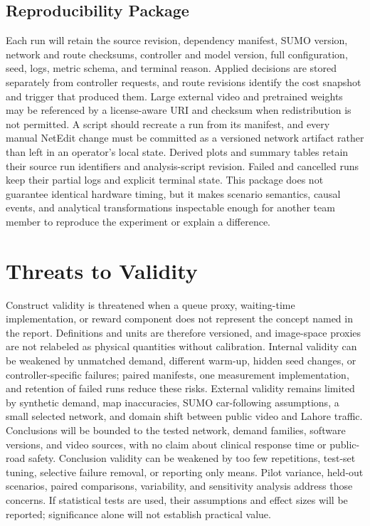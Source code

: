 \subsection{Reproducibility Package}

Each run will retain the source revision, dependency manifest, SUMO version, network and route checksums, controller and model version, full configuration, seed, logs, metric schema, and terminal reason. Applied decisions are stored separately from controller requests, and route revisions identify the cost snapshot and trigger that produced them. Large external video and pretrained weights may be referenced by a license-aware URI and checksum when redistribution is not permitted. A script should recreate a run from its manifest, and every manual NetEdit change must be committed as a versioned network artifact rather than left in an operator's local state. Derived plots and summary tables retain their source run identifiers and analysis-script revision. Failed and cancelled runs keep their partial logs and explicit terminal state. This package does not guarantee identical hardware timing, but it makes scenario semantics, causal events, and analytical transformations inspectable enough for another team member to reproduce the experiment or explain a difference.

\section{Threats to Validity}

Construct validity is threatened when a queue proxy, waiting-time implementation, or reward component does not represent the concept named in the report. Definitions and units are therefore versioned, and image-space proxies are not relabeled as physical quantities without calibration. Internal validity can be weakened by unmatched demand, different warm-up, hidden seed changes, or controller-specific failures; paired manifests, one measurement implementation, and retention of failed runs reduce these risks. External validity remains limited by synthetic demand, map inaccuracies, SUMO car-following assumptions, a small selected network, and domain shift between public video and Lahore traffic. Conclusions will be bounded to the tested network, demand families, software versions, and video sources, with no claim about clinical response time or public-road safety. Conclusion validity can be weakened by too few repetitions, test-set tuning, selective failure removal, or reporting only means. Pilot variance, held-out scenarios, paired comparisons, variability, and sensitivity analysis address those concerns. If statistical tests are used, their assumptions and effect sizes will be reported; significance alone will not establish practical value.

